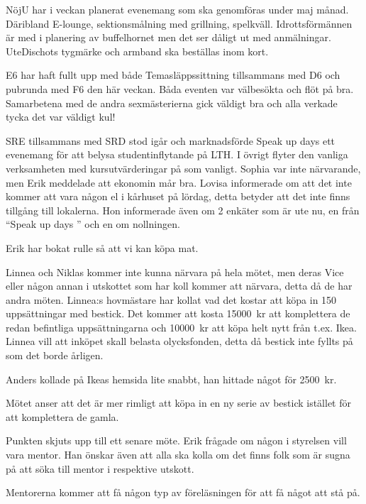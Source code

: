 \documentclass[10pt]{article}
\begin{document}
\begin{paragrafer}
\begin{paragrafer}
NöjU har i veckan planerat evenemang som ska genomföras under maj månad. Däribland E-lounge, sektionsmålning med grillning, spelkväll. Idrottsförmännen är med i planering av buffelhornet men det ser dåligt ut med anmälningar. UteDischots tygmärke och armband ska beställas inom kort.

E6 har haft fullt upp med både Temasläppssittning tillsammans med D6 och pubrunda med F6 den här veckan. Båda eventen var välbesökta och flöt på bra. Samarbetena med de andra sexmästerierna gick väldigt bra och alla verkade tycka det var väldigt kul!

SRE tillsammans med SRD stod igår och marknadsförde Speak up days ett evenemang för att belysa studentinflytande på LTH. I övrigt flyter den vanliga verksamheten med kursutvärderingar på som vanligt.
Sophia var inte närvarande, men Erik meddelade att ekonomin mår bra.
Lovisa informerade om att det inte kommer att vara någon el i kårhuset på lördag, detta betyder att det inte finns tillgång till lokalerna. Hon informerade även om 2 enkäter som är ute nu, en från ``Speak up days
'' och en om nollningen.
\end{paragrafer}
\newpage
{}
Erik har bokat rulle så att vi kan köpa mat.

Linnea och Niklas kommer inte kunna närvara på hela mötet, men deras Vice eller någon annan i utskottet som har koll kommer att närvara, detta då de har andra möten.
Linnea:s hovmästare har kollat vad det kostar att köpa in 150 uppsättningar med bestick. Det kommer att kosta \SI{15000}{kr} att komplettera de redan befintliga uppsättningarna och \SI{10000}{kr} att köpa helt nytt från t.ex. Ikea. Linnea vill att inköpet skall belasta olycksfonden, detta då bestick inte fyllts på som det borde årligen.

Anders kollade på Ikeas hemsida lite snabbt, han hittade något för \SI{2500}{kr}.

Mötet anser att det är mer rimligt att köpa in en ny serie av bestick istället för att komplettera de gamla.

Punkten skjuts upp till ett senare möte.
Erik frågade om någon i styrelsen vill vara mentor. Han önskar även att alla ska kolla om det finns folk som är sugna på att söka till mentor i respektive utskott.

Mentorerna kommer att få någon typ av föreläsningen för att få något att stå på.


\end{paragrafer}
\end{document}
